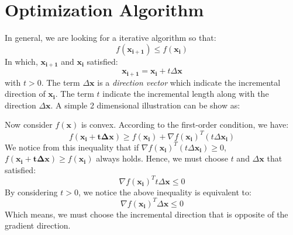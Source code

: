 \documentclass[10pt,a4paper]{article}
\begin{document}
\section{Optimization Algorithm}
In general, we are looking for a iterative algorithm so that:
\begin{equation*}
	f(\mathbf{x_{i + 1}}) \leq f(\mathbf{x_{i}})
\end{equation*}
In which, $\mathbf{x_{i + 1}}$ and $\mathbf{x_{i}}$ satisfied:
\begin{equation}
	\mathbf{x_{i + 1}} = \mathbf{x_{i}} + t \Delta \mathbf{x}
	\label{iter}
\end{equation}
with $t > 0$. The term $\Delta \mathbf{x}$ is a \textit{direction vector} which indicate the incremental direction of $\mathbf{x_{i}}$. The term $t$ indicate the incremental length along with the direction $\Delta \mathbf{x}$. A simple 2 dimensional illustration can be show as:
\begin{figure}[H]
	\center
\end{figure}  
Now consider $f(\mathbf{x})$ is convex. According to the first-order condition, we have:
\begin{equation*}
	f(\mathbf{x_{i} + t \Delta \mathbf{x}}) \geq f(\mathbf{x_{i}}) + \nabla f(\mathbf{x_{i}})^{T} (t \Delta \mathbf{x_{i}})
\end{equation*}
We notice from this inequality that if $ \nabla f(\mathbf{x_{i}})^{T} (t \Delta \mathbf{x_{i}}) \geq 0$, $f(\mathbf{x_{i} + t \Delta \mathbf{x}}) \geq f(\mathbf{x_{i}})$ always holds. Hence, we must choose $t$ and $\Delta \mathbf{x}$ that satisfied:
\begin{equation*}
	\nabla f(\mathbf{x_{i}})^{T} t \Delta \mathbf{x} \leq 0
\end{equation*}
By considering $t > 0$, we notice the above inequality is equivalent to:
\begin{equation}
	\nabla f(\mathbf{x_{i}})^{T} \Delta \mathbf{x} \leq 0
	\label{descent}
\end{equation}
Which means, we must choose the incremental direction that is opposite of the gradient direction.
\end{document}
